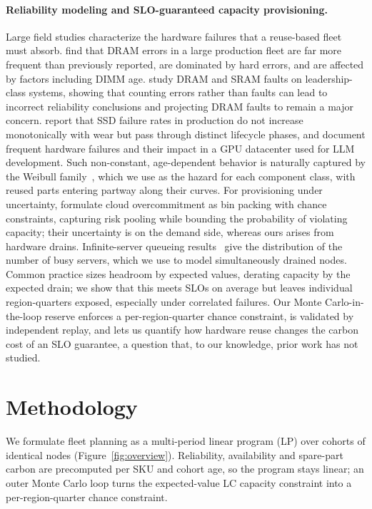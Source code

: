 \documentclass{article} %
\begin{document}
\paragraph{Reliability modeling and SLO-guaranteed capacity provisioning.}
Large field studies characterize the hardware failures that a reuse-based fleet must absorb. \citet{Schroeder2009DramErrors} find that DRAM errors in a large production fleet are far more frequent than previously reported, are dominated by hard errors, and are affected by factors including DIMM age. \citet{Sridharan2015MemoryErrors} study DRAM and SRAM faults on leadership-class systems, showing that counting errors rather than faults can lead to incorrect reliability conclusions and projecting DRAM faults to remain a major concern. \citet{Meza2015LargescaleFlash} report that SSD failure rates in production do not increase monotonically with wear but pass through distinct lifecycle phases, and \citet{Hu2024CharacterizationLarge} document frequent hardware failures and their impact in a GPU datacenter used for LLM development. Such non-constant, age-dependent behavior is naturally captured by the Weibull family~\citep{Weibull1951StatisticalDistribution}, which we use as the hazard for each component class, with reused parts entering partway along their curves. For provisioning under uncertainty, \citet{Cohen2017OvercommitmentCloud} formulate cloud overcommitment as bin packing with chance constraints, capturing risk pooling while bounding the probability of violating capacity; their uncertainty is on the demand side, whereas ours arises from hardware drains. Infinite-server queueing results~\citep{Eick1993PhysicsMtg} give the distribution of the number of busy servers, which we use to model simultaneously drained nodes. Common practice sizes headroom by expected values, derating capacity by the expected drain; we show that this meets SLOs on average but leaves individual region-quarters exposed, especially under correlated failures. Our Monte Carlo-in-the-loop reserve enforces a per-region-quarter chance constraint, is validated by independent replay, and lets us quantify how hardware reuse changes the carbon cost of an SLO guarantee, a question that, to our knowledge, prior work has not studied.

\section{Methodology}
\label{sec:method}
We formulate fleet planning as a multi-period linear program (LP) over cohorts of identical nodes (Figure~\ref{fig:overview}). Reliability, availability and spare-part carbon are precomputed per SKU and cohort age, so the program stays linear; an outer Monte Carlo loop turns the expected-value LC capacity constraint into a per-region-quarter chance constraint.
\end{document}
